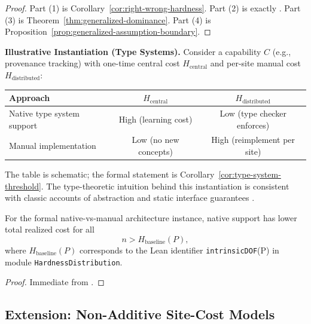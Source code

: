 \begin{proof}
Part (1) is Corollary~\ref{cor:right-wrong-hardness}. Part (2) is exactly . Part (3) is Theorem~\ref{thm:generalized-dominance}. Part (4) is Proposition~\ref{prop:generalized-assumption-boundary}.
\end{proof}

\textbf{Illustrative Instantiation (Type Systems).} Consider a capability $C$ (e.g., provenance tracking) with one-time central cost $H_{\text{central}}$ and per-site manual cost $H_{\text{distributed}}$:

\begin{center}
\begin{tabular}{lcc}
\toprule
\textbf{Approach} & $H_{\text{central}}$ & $H_{\text{distributed}}$ \\
\midrule
Native type system support & High (learning cost) & Low (type checker enforces) \\
Manual implementation & Low (no new concepts) & High (reimplement per site) \\
\bottomrule
\end{tabular}
\end{center}
The table is schematic; the formal statement is Corollary~\ref{cor:type-system-threshold}. The type-theoretic intuition behind this instantiation is consistent with classic accounts of abstraction and static interface guarantees \cite{Cardelli1985, reynolds1983types, pierce2002types, liskov1994behavioral, siek2006gradual, gamma1994design}.

\begin{corollary}\label{cor:type-system-threshold}
For the formal native-vs-manual architecture instance, native support has lower total realized cost for all
\[
n > H_{\mathrm{baseline}}(P),
\]
where $H_{\mathrm{baseline}}(P)$ corresponds to the Lean identifier
\texttt{intrinsicDOF}(P) in module \nolinkurl{HardnessDistribution}.
\end{corollary}

\begin{proof}
Immediate from .
\end{proof}

\subsection{Extension: Non-Additive Site-Cost Models}\label{sec:nonadditive-site-costs}

